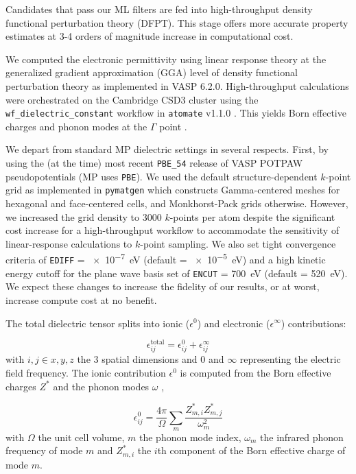 \documentclass{article}
\begin{document}
Candidates that pass our ML filters are fed into high-throughput density functional perturbation theory (DFPT).
This stage offers more accurate property estimates at 3-4 orders of magnitude increase in computational cost.

We computed the electronic permittivity using linear response theory at the generalized gradient approximation (GGA) level of density functional perturbation theory as implemented in VASP 6.2.0.
High-throughput calculations were orchestrated on the Cambridge CSD3 cluster using the \texttt{wf\_dielectric\_constant} workflow in \texttt{atomate} v1.1.0 \cite{mathew_atomate_2017}.
This yields Born effective charges and phonon modes at the $\Gamma$ point \cite{lee_comparative_2007}.

We depart from standard MP dielectric settings in several respects.
First, by using the (at the time) most recent \texttt{PBE\_54} release of VASP POTPAW pseudopotentials (MP uses \texttt{PBE}).
We used the default structure-dependent $k$-point grid as implemented in \texttt{pymatgen} which constructs Gamma-centered meshes for hexagonal and face-centered cells, and Monkhorst-Pack grids otherwise.
However, we increased the grid density to \num{3000} $k$-points per atom despite the significant cost increase for a high-throughput workflow to accommodate the sensitivity of linear-response calculations to $k$-point sampling.
We also set tight convergence criteria of \texttt{EDIFF} = \SI{e-7}{eV} (default = \SI{e-5}{eV}) and a high kinetic energy cutoff for the plane wave basis set of \texttt{ENCUT} = \SI{700}{eV} (default = \SI{520}{eV}).
We expect these changes to increase the fidelity of our results, or at worst, increase compute cost at no benefit.

The total dielectric tensor splits into ionic ($\epsilon^0$) and electronic ($\epsilon^\infty$) contributions:

\begin{equation}
    \epsilon_{ij}^\text{total}
    = \epsilon_{ij}^0+\epsilon_{ij}^\infty
\end{equation}
with $i,j \in {x,y,z}$ the 3 spatial dimensions and 0 and $\infty$ representing the electric field frequency.
The ionic contribution $\epsilon^0$ is computed from the Born effective charges $Z^*$ and the phonon modes $\omega$ \cite{gonze_dynamical_1997},

\begin{equation}
    \epsilon_{ij}^0
    = \frac{4 \pi}{\Omega} \sum_{m} \frac{Z_{m,i}^* Z_{m,j}^*}{\omega_m^2}
\end{equation}
with $\Omega$ the unit cell volume, $m$ the phonon mode index, $\omega_m$ the infrared phonon frequency of
mode $m$ and $Z_{m,i}^*$ the $i$th component of the Born effective charge of mode $m$.
\end{document}
